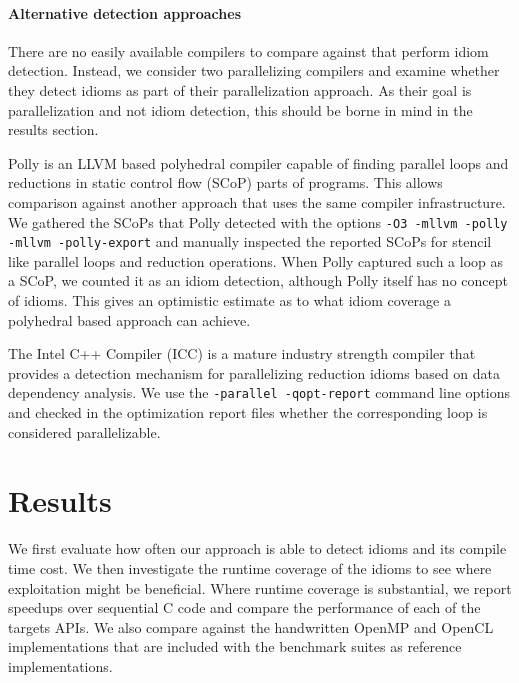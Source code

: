     \paragraph{Alternative detection approaches}
    \hspace{0.2cm}There are no easily available compilers to compare against
    that perform idiom detection.
    Instead, we consider two parallelizing compilers and examine
    whether they detect idioms as part of their parallelization approach.
    As their goal is parallelization and not idiom detection, this should be
    borne in mind in the results section.

    Polly \cite{Doerfert2015Polly} is an LLVM based polyhedral compiler
    capable of finding parallel loops and reductions in static control
    flow (SCoP) parts of programs.  This allows comparison against
    another approach that uses the same compiler infrastructure.
    We gathered the SCoPs that Polly detected with the options
    \texttt{-O3 -mllvm -polly -mllvm -polly-export} and manually inspected
    the reported SCoPs for stencil like parallel loops and reduction operations.
    When Polly captured such a loop as a SCoP, we counted it as an idiom
    detection, although Polly itself has no concept of idioms.
    This gives an optimistic estimate as to what idiom coverage a polyhedral
    based approach can achieve.

    The Intel C++ Compiler (ICC) is a mature industry strength compiler that
    provides a detection mechanism for parallelizing reduction idioms based on
    data dependency analysis.
    We use the \texttt{-parallel -qopt-report} command line options and checked
    in the optimization report files whether the corresponding loop is
    considered parallelizable.

\section{Results}

    We first evaluate how often our approach is able to detect idioms and its
    compile time cost.
    We then investigate the runtime coverage of the idioms to see where
    exploitation might be beneficial.
    Where runtime coverage is substantial, we report speedups over sequential C
    code and compare the performance of each of the targets APIs.
    We also compare against the handwritten OpenMP and OpenCL implementations
    that are included with the benchmark suites as reference implementations.

